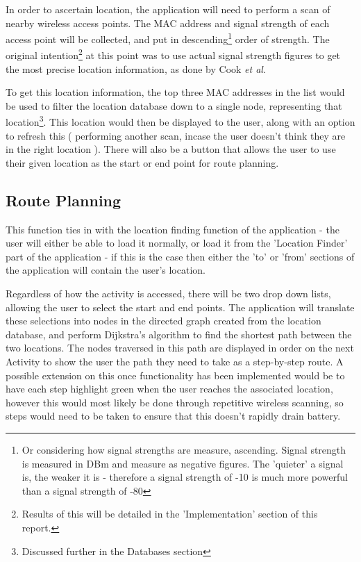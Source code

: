 \documentclass[11pt]{informatics-report}
\begin{document}
In order to ascertain location, the application will need to perform a scan of nearby wireless access points. The MAC address and signal strength of each access point will be collected, and put in descending\footnote{Or considering how signal strengths are measure, ascending. Signal strength is measured in DBm and measure as negative figures. The 'quieter' a signal is, the weaker it is - therefore a signal strength of -10 is much more powerful than a signal strength of -80} order of strength.
The original intention\footnote{Results of this will be detailed in the 'Implementation' section of this report.} at this point was to use actual signal strength figures to get the most precise location information, as done by Cook \textit{et al}\cite{cook2005indoor}. 

To get this location information, the top three MAC addresses in the list would be used to filter the location database down to a single node, representing that location\footnote{Discussed further in the Databases section}. This location would then be displayed to the user, along with an option to refresh this ( performing another scan, incase the user doesn't think they are in the right location ). There will also be a button that allows the user to use their given location as the start or end point for route planning.

\subsection{Route Planning}

This function ties in with the location finding function of the application - the user will either be able to load it normally, or load it from the 'Location Finder' part of the application - if this is the case then either the 'to' or 'from' sections of the application will contain the user's location.

Regardless of how the activity is accessed, there will be two drop down lists, allowing the user to select the start and end points. The application will translate these selections into nodes in the directed graph created from the location database, and perform Dijkstra's algorithm to find the shortest path between the two locations. The nodes traversed in this path are displayed in order on the next Activity to show the user the path they need to take as a step-by-step route. A possible extension on this once functionality has been implemented would be to have each step highlight green when the user reaches the associated location, however this would most likely be done through repetitive wireless scanning, so steps would need to be taken to ensure that this doesn't rapidly drain battery. 
\end{document}
